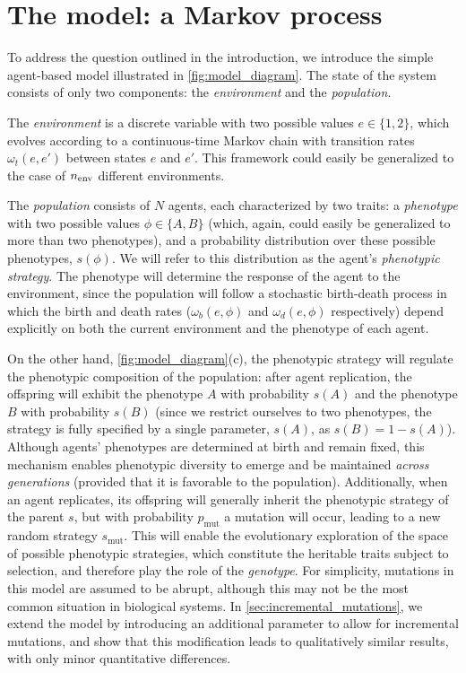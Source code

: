 \documentclass[aps,pre,reprint,10pt,superscriptaddress]{revtex4-2}
\begin{document}
\section{The model: a Markov process} \label{sec:model}

To address the question outlined in the introduction, we introduce the simple agent-based model illustrated in \cref{fig:model_diagram}. The state of the system consists of only two components: the \emph{environment} and the \emph{population}.

The \emph{environment} is a discrete variable with two possible values  $e\in\{1,2\}$, which evolves according to a continuous-time Markov chain with transition rates $\omega_t(e,e')$ between states $e$ and $e'$. This framework could easily be generalized to the case of $n_{\rm env}$ different environments.

The \emph{population} consists of $N$ agents, each characterized by two traits: a \emph{phenotype} with two possible values $\phi\in\{A,B\}$ (which, again, could easily be generalized to more than two phenotypes), and a probability distribution over these possible phenotypes, $s(\phi)$. We will refer to this distribution as the agent's \emph{phenotypic strategy}. The phenotype will determine the response of the agent to the environment, since the population will follow a stochastic birth-death process in which the birth and death rates ($\omega_b(e,\phi)$ and $\omega_d(e,\phi)$ respectively) depend explicitly on both the current environment and the phenotype of each agent.

On the other hand, \cref{fig:model_diagram}(c), the phenotypic strategy will regulate the phenotypic composition of the population: after agent replication, the offspring will exhibit the phenotype $A$ with probability $s(A)$ and the phenotype $B$ with probability $s(B)$ (since we restrict ourselves to two phenotypes, the strategy is fully specified by a single parameter, $s(A)$, as $s(B)=1-s(A)$). Although agents' phenotypes are determined at birth and remain fixed, this mechanism enables phenotypic diversity to emerge and be maintained \emph{across generations} (provided that it is favorable to the population). Additionally, when an agent replicates, its offspring will generally inherit the phenotypic strategy of the parent $s$, but with probability $p_\text{mut}$ a mutation will occur, leading to a new random strategy $s_\text{mut}$. This will enable the evolutionary exploration of the space of possible phenotypic strategies, which constitute the heritable traits subject to selection, and therefore play the role of the \emph{genotype}. For simplicity, mutations in this model are assumed to be abrupt, although this may not be the most common situation in biological systems. In \cref{sec:incremental_mutations}, we extend the model by introducing an additional parameter to allow for incremental mutations, and show that this modification leads to qualitatively similar results, with only minor quantitative differences.
\end{document}
